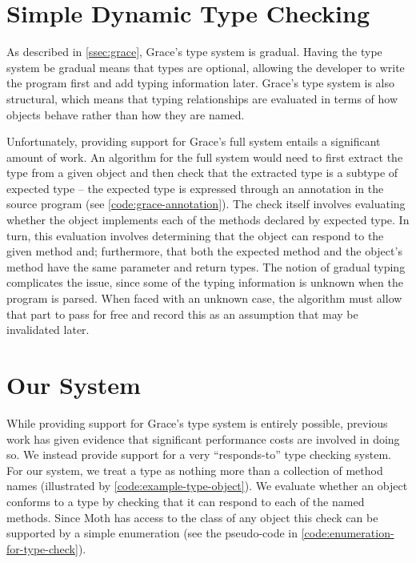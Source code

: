 
\section{Simple Dynamic Type Checking}
\label{sec:method}

As described in \cref{ssec:grace},
Grace's type system is gradual. 
Having the type system be gradual means that types are optional,
allowing the developer to write the program first and add typing information later. 
Grace's type system is also structural, 
which means that typing relationships are evaluated
in terms of how objects behave rather than how they are named. 

Unfortunately, providing support for Grace's full system entails a significant amount of work.
An algorithm for the full system would need to 
first extract the type from a given object 
and then check that the extracted type is a subtype of expected type 
-- the expected type is expressed through an  annotation in the source program
(see \cref{code:grace-annotation}).
The check itself involves evaluating
whether the object implements each of the methods declared by expected type.
In turn, this evaluation involves determining that the object can respond to the given method and;
furthermore, that both the expected method and the object's method have the same parameter and return types.
The notion of gradual typing complicates the issue,
since some of the typing information is unknown when the program is parsed. 
When faced with an unknown case,
the algorithm must allow that part to pass for free
and record this as an assumption that may be invalidated later.

\section{Our System}

While providing support for Grace's type system is entirely possible,
previous work has given evidence that significant performance costs are involved in doing so.
We instead provide support for a very ``responds-to'' type checking system. 
For our system,
we treat a type as nothing more than a collection of method names
(illustrated by \cref{code:example-type-object}).
We evaluate whether an object conforms to a type
by checking that it can respond to each of the named methods.
Since Moth has access to the class of any object this check 
can be supported by a simple enumeration
(see the pseudo-code in \cref{code:enumeration-for-type-check}).

